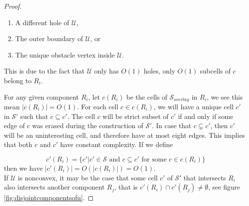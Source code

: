 \begin{proof}
\begin{enumerate}
\item A different hole of $\mathcal{U}$,
\item The outer boundary of $\mathcal{U}$, or
\item The unique obstacle vertex inside $\mathcal{U}$.
\end{enumerate}

This is due to the fact that $\mathcal{U}$ only has $O(1)$ holes, only $O(1)$ subcells 
of $c$ belong to $R_i$. 

For any given component $R_i$, let $c(R_i)$ be the cells of $\mathcal{S}_{overlay}$ in $R_i$, 
we see this mean $|c(R_i)| = O(1)$. For each cell $c\in c(R_i)$, we will have a unique cell $c'$ 
in $\mathcal{S}'$ such that $c \subseteq c'$. The cell $c$ will be strict subset of $c'$ if 
and only if some edge of $c$ was erased during the construction of $\mathcal{S}'$. 
In case that $c \subsetneq c'$, then $c'$ will be an uninteresting cell, and therefore have at 
most eight edges. This implies that both $c$ and $c'$ have constant complexity. 
If we define

$$c'(R_i)=\{c'|c'\in\mathcal{S} \text{ and } c \subseteq c' \text{ for some } c\in c(R_i)\}$$
then we have $|c'(R_i)| = O(|c(R_i)|) = O(1)$. \\

If $\mathcal{U}$ is nonconvex, it may be the case that some cell $c'$ of $\mathcal{S}'$ that 
intersects $R_i$ also intersects another component $R_j$, that is $c'(R_i)\cap c'(R_j) \neq 
\emptyset$, see figure \ref{fig:disjointcomponentsofu}.


\end{proof}
